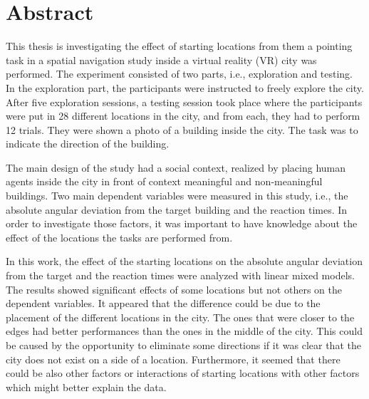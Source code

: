 \chapter*{Abstract}\label{cha:abstract}


This thesis is investigating the effect of starting locations from them a pointing task in a spatial navigation study inside a virtual reality (VR) city was performed. The experiment consisted of two parts, i.e., exploration and testing. In the exploration part, the participants were instructed to freely explore the city. After five exploration sessions, a testing session took place where the participants were put in 28 different locations in the city, and from each, they had to perform 12 trials. They were shown a photo of a building inside the city. The task was to indicate the direction of the building.

The main design of the study had a social context, realized by placing human agents inside the city in front of context meaningful and non-meaningful buildings. Two main dependent variables were measured in this study, i.e., the absolute angular deviation from the target building and the reaction times. In order to investigate those factors, it was important to have knowledge about the effect of the locations the tasks are performed from. 

In this work, the effect of the starting locations on the absolute angular deviation from the target and the reaction times were analyzed with linear mixed models. The results showed significant effects of some locations but not others on the dependent variables. It appeared that the difference could be due to the placement of the different locations in the city. The ones that were closer to the edges had better performances than the ones in the middle of the city. This could be caused by the opportunity to eliminate some directions if it was clear that the city does not exist on a side of a location. Furthermore, it seemed that there could be also other factors or interactions of starting locations with other factors which might better explain the data.
